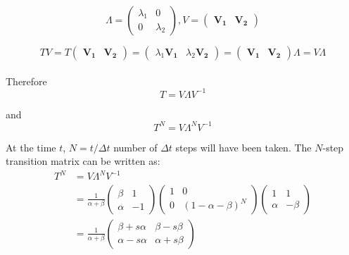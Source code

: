 \documentclass{article}
\begin{document}
\begin{equation}
    \Lambda=\begin{pmatrix}
        {\lambda}_1 & 0 \\ 0 & {\lambda}_2
    \end{pmatrix},
    V=\begin{pmatrix}
        \boldsymbol{V_1} & \boldsymbol{V_2}
    \end{pmatrix}
\end{equation}

\begin{equation}
    TV=T\begin{pmatrix}
        \boldsymbol{V_1} & \boldsymbol{V_2}
    \end{pmatrix}=
    \begin{pmatrix}
        {\lambda}_1\boldsymbol{V_1} & {\lambda}_2\boldsymbol{V_2}
    \end{pmatrix}=
    \begin{pmatrix}
        \boldsymbol{V_1} & \boldsymbol{V_2}
    \end{pmatrix}\Lambda=
    V\Lambda
\end{equation} \\

Therefore \\

\begin{equation}
T=V\Lambda V^{-1}
\end{equation}

and \\

\begin{equation}
T^N=V{\Lambda}^N V^{-1}
\end{equation}

At the time $t$, $N=t/{\Delta t}$ number of $\Delta t$ steps will have been taken. The $N$-step transition matrix can be written as: \\

\begin{equation}
    \begin{aligned}
    T^N &=V\Lambda^N V^{-1} \\
        &=\frac{1}{\alpha + \beta} \begin{pmatrix} \beta & 1 \\ \alpha & -1 \end{pmatrix} 
            \begin{pmatrix} 1 & 0 \\ 0 & (1 - \alpha - \beta)^N \end{pmatrix} 
            \begin{pmatrix} 1 & 1 \\ \alpha & -\beta \end{pmatrix} \\
        &=\frac{1}{\alpha + \beta}
            \begin{pmatrix} 
                \beta + s \alpha & \beta - s \beta \\
                \alpha - s \alpha & \alpha + s \beta 
            \end{pmatrix}\
    \end{aligned}
\end{equation} \\
\end{document}
